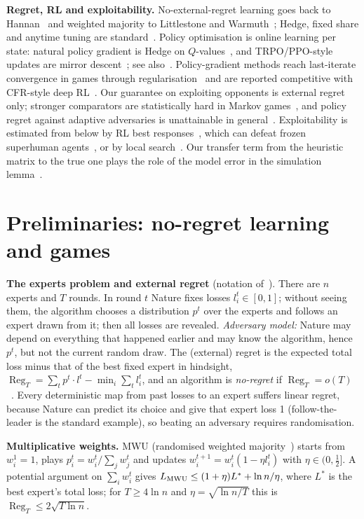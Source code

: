 \documentclass[10pt]{article}
\theoremstyle{plain}
\theoremstyle{definition}
\theoremstyle{remark}
\DeclareMathOperator{\Reg}{Reg}
\begin{document}
\textbf{Regret, RL and exploitability.} No-external-regret learning goes back to Hannan~\cite{Hannan57} and weighted majority to Littlestone and Warmuth~\cite{LW94}; Hedge, fixed share and anytime tuning are standard~\cite{FS97,HW98,CBL06}. Policy optimisation is online learning per state: natural policy gradient is Hedge on $Q$-values~\cite{Aga21}, and TRPO/PPO-style updates are mirror descent~\cite{Tom22,Sha20}; see also~\cite{Pol19,Ross11}. Policy-gradient methods reach last-iterate convergence in games through regularisation~\cite{Sok23,Per22} and are reported competitive with CFR-style deep RL~\cite{Rud25}. Our guarantee on exploiting opponents is external regret only; stronger comparators are statistically hard in Markov games~\cite{Tian21,Liu22}, and policy regret against adaptive adversaries is unattainable in general~\cite{Aro12b}. Exploitability is estimated from below by RL best responses~\cite{Tim20,Lan17}, which can defeat frozen superhuman agents~\cite{Wang23}, or by local search~\cite{Lis17}. Our transfer term from the heuristic matrix to the true one plays the role of the model error in the simulation lemma~\cite{KS02}.

\section{Preliminaries: no-regret learning and games}
\label{sec:prelim}
\textbf{The experts problem and external regret} (notation of~\cite{CS535L6}). There are $n$ experts and $T$ rounds. In round $t$ Nature fixes losses $l^t_i\in[0,1]$; without seeing them, the algorithm chooses a distribution $p^t$ over the experts and follows an expert drawn from it; then all losses are revealed. \emph{Adversary model:} Nature may depend on everything that happened earlier and may know the algorithm, hence $p^t$, but not the current random draw. The (external) regret is the expected total loss minus that of the best fixed expert in hindsight, $\Reg_T=\sum_tp^t\cdot l^t-\min_i\sum_tl^t_i$, and an algorithm is \emph{no-regret} if $\Reg_T=o(T)$~\cite{Hannan57}. Every deterministic map from past losses to an expert suffers linear regret, because Nature can predict its choice and give that expert loss 1 (follow-the-leader is the standard example), so beating an adversary requires randomisation.

\textbf{Multiplicative weights.} MWU (randomised weighted majority~\cite{LW94}) starts from $w^1_i=1$, plays $p^t_i=w^t_i/\sum_jw^t_j$ and updates $w^{t+1}_i=w^t_i(1-\eta l^t_i)$ with $\eta\in(0,\frac12]$. A potential argument on $\sum_iw^t_i$ gives $L_{\rm MWU}\le(1+\eta)L^*+\ln n/\eta$, where $L^*$ is the best expert's total loss; for $T\ge4\ln n$ and $\eta=\sqrt{\ln n/T}$ this is $\Reg_T\le2\sqrt{T\ln n}$.
\end{document}
